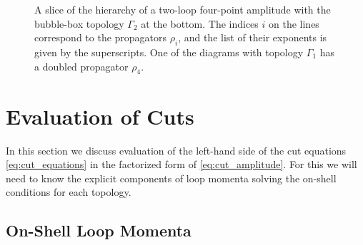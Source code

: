 { 

\begin{figure}[ht] 
  \centering
%
  \caption{A slice of the hierarchy of a two-loop four-point amplitude with the bubble-box topology $\Gamma_2$ at the bottom.
    The indices $i$ on the lines correspond to the propagators $\rho_i$, and the list of their exponents is given by the superscripts.
    One of the diagrams with topology $\Gamma_1$ has a doubled propagator $\rho_4$.
  }
  \label{fig:example_subleading_pole}
\end{figure}


}

\section{Evaluation of Cuts}
\label{sec:evaluation_of_cuts}

In this section we discuss evaluation of the left-hand side of the cut equations \eqref{eq:cut_equations}
in the factorized form of \cref{eq:cut_amplitude}.
For this we will need to know the explicit components of loop momenta solving the on-shell conditions for each topology.

\subsection{On-Shell Loop Momenta}
\label{sec:osm}

